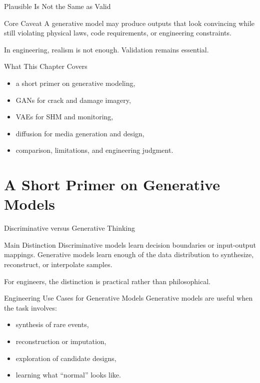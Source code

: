 \documentclass[12pt]{beamer}
\begin{document}
\begin{frame}{Plausible Is Not the Same as Valid}
  \begin{warningbox}{Core Caveat}
    A generative model may produce outputs that look convincing while still violating physical laws, code requirements, or engineering constraints.
  \end{warningbox}

  In engineering, realism is not enough. Validation remains essential.
\end{frame}

\begin{frame}{What This Chapter Covers}
  \begin{itemize}
    \item a short primer on generative modeling,
    \item GANs for crack and damage imagery,
    \item VAEs for SHM and monitoring,
    \item diffusion for media generation and design,
    \item comparison, limitations, and engineering judgment.
  \end{itemize}
\end{frame}

\section{A Short Primer on Generative Models}

\begin{frame}{Discriminative versus Generative Thinking}
  \begin{conceptbox}{Main Distinction}
    Discriminative models learn decision boundaries or input-output mappings. Generative models learn enough of the data distribution to synthesize, reconstruct, or interpolate samples.
  \end{conceptbox}

  For engineers, the distinction is practical rather than philosophical.
\end{frame}

\begin{frame}{Engineering Use Cases for Generative Models}
  Generative models are useful when the task involves:
  \begin{itemize}
    \item synthesis of rare events,
    \item reconstruction or imputation,
    \item exploration of candidate designs,
    \item learning what ``normal'' looks like.
  \end{itemize}
\end{frame}
\end{document}
